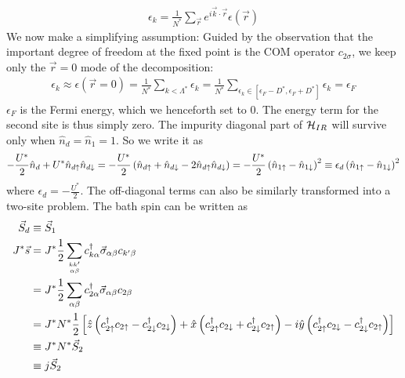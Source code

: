 \documentclass[12pt,twoside]{article}
\numberwithin{equation}{section}
\begin{document}
\begin{equation}\begin{aligned}
	\epsilon_k = \frac{1}{N^*}\sum_{\vec r}e^{i \vec{k}\cdot\vec{r}}\epsilon(\vec r)
\end{aligned}\end{equation}
We now make a simplifying assumption: Guided by the observation that the important degree of freedom at the fixed point is the COM operator \(c_{2\sigma}\), we keep only the \(\vec r=0\) mode of the decomposition:
\begin{equation}\begin{aligned}
	\epsilon_k \approx \epsilon(\vec r=0) = \frac{1}{N^*}\sum_{k<\Lambda^*}\epsilon_k = \frac{1}{N^*}\sum_{\epsilon_k \in [\epsilon_F - D^*, \epsilon_F + D^*]}\epsilon_k = \epsilon_F
\end{aligned}\end{equation}
\(\epsilon_F\) is the Fermi energy, which we henceforth set to 0. The energy term for the second site is thus simply zero. The impurity diagonal part of \(\mathcal{H}_{IR}\) will survive only when \(\hat n_d = \hat n_1 = 1\). So we write it as
\begin{equation}\begin{aligned}
	- \frac{U^*}{2}\hat n_d + U^* \hat n_{d\uparrow}\hat n_{d\downarrow} = - \frac{U^*}{2}\left(\hat n_{d\uparrow} + \hat n_{d \downarrow} - 2\hat n_{d\uparrow}\hat n_{d\downarrow}\right) = - \frac{U^*}{2} \left(\hat n_{1 \uparrow} - \hat n_{1 \downarrow}\right)^2 \equiv \epsilon_d \left(\hat n_{1 \uparrow} - \hat n_{1 \downarrow}\right)^2
\end{aligned}\end{equation}
where \(\epsilon_d = - \frac{U^*}{2}\). The off-diagonal terms can also be similarly transformed into a two-site problem. The bath spin can be written as
\begin{equation}\begin{aligned}
	\vec S_d &\equiv \vec S_1\\
	J^*\vec s &= J^* \frac{1}{2}\sum_{kk^\prime\atop{\alpha\beta}}c^\dagger_{k\alpha}\vec \sigma_{\alpha\beta}c_{k^\prime\beta} \\
	       &= J^*\frac{1}{2}\sum_{\alpha\beta}c^\dagger_{2\alpha}\vec \sigma_{\alpha\beta}c_{2\beta} \\
	       &= J^* N^* \frac{1}{2}\left[\hat z\left(c^\dagger_{2 \uparrow}c_{2 \uparrow} - c^\dagger_{2 \downarrow} c_{2 \downarrow} \right) + \hat x \left(c^\dagger_{2 \uparrow}c_{2 \downarrow} + c^\dagger_{2 \downarrow} c_{2 \uparrow} \right) -i \hat y \left( c^\dagger_{2 \uparrow}c_{2 \downarrow} - c^\dagger_{2 \downarrow} c_{2 \uparrow} \right)\right]\\
	       &\equiv J^*N^* \vec S_2\\
	       &\equiv j \vec S_2\\
\end{aligned}\end{equation}
\end{document}
